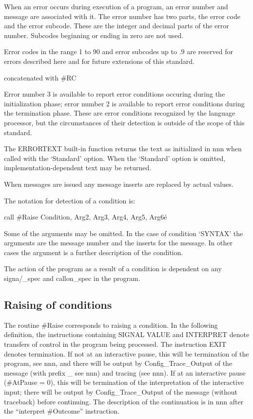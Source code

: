When an error occurs during execution of a program, an error number and
message are associated with it. The error number has two parts, the
error code and the error subcode. These are the integer and decimal
parts of the error number. Subcodes beginning or ending in zero are not
used.

Error codes in the range 1 to 90 and error subcodes up to .9 are
reserved for errors described here and for future extensions of this
standard.

concatenated with \#RC

Error number 3 is available to report error conditions occuring during
the initialization phase; error number 2 is available to report error
conditions during the termination phase. These are error conditions
recognized by the language processor, but the circumstances of their
detection is outside of the scope of this standard.

The ERRORTEXT built-in function returns the text as initialized in nnn
when called with the `Standard' option. When the `Standard' option is
omitted, implementation-dependent text may be returned.

When messages are issued any message inserts are replaced by actual
values.

The notation for detection of a condition is:

call \#Raise Condition, Arg2, Arg3, Arg4, Arg5, Arg6é

Some of the arguments may be omitted. In the case of condition `SYNTAX'
the arguments are the message number and the inserts for the message. In
other cases the argument is a further description of the condition.

The action of the program as a result of a condition is dependent on any
signa/\_spec and callon\_spec in the program.

\hypertarget{raising-of-conditions}{%
\subsection{Raising of conditions}\label{raising-of-conditions}}

The routine \#Raise corresponds to raising a condition. In the following
definition, the instructions containing SIGNAL VALUE and INTERPRET
denote transfers of control in the program being processed. The
instruction EXIT denotes termination. If not at an interactive pause,
this will be termination of the program, see nnn, and there will be
output by Config\_Trace\_Output of the message (with prefix \_ see nnn)
and tracing (see nnn). If at an interactive pause (\#AtPause = 0), this
will be termination of the interpretation of the interactive input;
there will be output by Config\_Trace\_Output of the message (without
traceback) before continuing. The description of the continuation is in
nnn after the ``interpret \#Outcome'' instruction.

